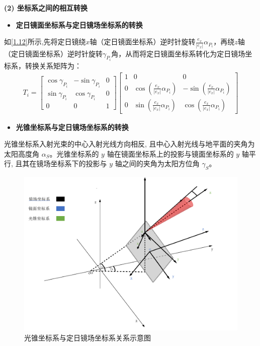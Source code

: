 \documentclass[../main.tex]{subfiles}
\begin{document}
\par \textbf{(2) 坐标系之间的相互转换}
 \begin{itemize}
  \item \textbf{定日镜面坐标系与定日镜场坐标系的转换}
  \end{itemize}
  \par 如\cref{1.12}所示,先将定日镜绕$x$轴（定日镜面坐标系）逆时针旋转$\frac{e_x}{|e_x|}\alpha _{P_i}$，再绕\(z\)轴（定日镜面坐标系）逆时针旋转$\gamma_{P_i}$角，从而将定日镜面坐标系转化为定日镜场坐标系，转换关系矩阵为：
\begin{align}\label{1.15}
  T_i= 
\begin{bmatrix}
\cos\gamma_{P_i} & -\sin\gamma_{P_i} & 0 \\
\sin\gamma_{P_i} & \cos\gamma_{P_i} & 0 \\
0 & 0 & 1
\end{bmatrix}
\begin{bmatrix}
1 & 0 & 0 \\
0 & \cos\left( \frac{e_x}{|e_x|}\alpha _{P_i} \right) & -\sin\left( \frac{e_x}{|e_x|}\alpha _{P_i} \right) \\
0 & \sin\left( \frac{e_x}{|e_x|}\alpha _{P_i} \right) & \cos\left( \frac{e_x}{|e_x|}\alpha _{P_i} \right)
\end{bmatrix}
\end{align}
 \begin{itemize}
  \item \textbf{光锥坐标系与定日镜场坐标系的转换}
  \end{itemize}
  \par 光锥坐标系入射光束的中心入射光线方向相反, 且中心入射光线与地平面的夹角为太阳高度角 $\alpha _S$。光锥坐标系的 $y$ 轴在镜面坐标系上的投影与镜面坐标系的 $y$ 轴平行, 且其在镜场坐标系下的投影与 $y$ 轴之间的夹角为太阳方位角 $\gamma_S$。
    \begin{figure}[H]
    \centering
    \includegraphics[width=.9\textwidth]{5}
    \caption{光锥坐标系与定日镜场坐标系关系示意图}
    \label{1.16}
\end{figure}
\end{document}
